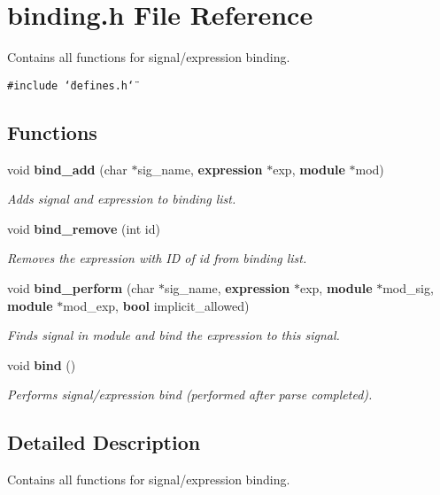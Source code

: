 \section{binding.h File Reference}
\label{binding_8h}
Contains all functions for signal/expression binding. 


{\tt \#include \char`\"{}defines.h\char`\"{}}\par
\subsection*{Functions}
\begin{CompactItemize}
\item 
void {\bf bind\_\-add} (char $\ast$sig\_\-name, {\bf expression} $\ast$exp, {\bf module} $\ast$mod)
\begin{CompactList}\small\item\em Adds signal and expression to binding list.\item\end{CompactList}\item 
void {\bf bind\_\-remove} (int id)
\begin{CompactList}\small\item\em Removes the expression with ID of id from binding list.\item\end{CompactList}\item 
void {\bf bind\_\-perform} (char $\ast$sig\_\-name, {\bf expression} $\ast$exp, {\bf module} $\ast$mod\_\-sig, {\bf module} $\ast$mod\_\-exp, {\bf bool} implicit\_\-allowed)
\begin{CompactList}\small\item\em Finds signal in module and bind the expression to this signal.\item\end{CompactList}\item 
void {\bf bind} ()
\begin{CompactList}\small\item\em Performs signal/expression bind (performed after parse completed).\item\end{CompactList}\end{CompactItemize}


\subsection{Detailed Description}
Contains all functions for signal/expression binding.



